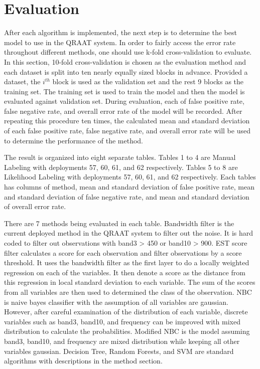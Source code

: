 \documentclass[twoside]{article}
\begin{document}

\section{Evaluation} 

After each algorithm is implemented, the next step is to determine the best model to use in the QRAAT system. In order to fairly access the error rate throughout different methods, one should use k-fold cross-validation to evaluate. In this section, 10-fold cross-validation is chosen as the evaluation method and each dataset is split into ten nearly equally sized blocks in advance. Provided a dataset, the $i^{th}$ block is used as the validation set and the rest 9 blocks as the training set. The training set is used to train the model and then the model is evaluated against validation set. During evaluation, each of false positive rate, false negative rate, and overall error rate of the model will be recorded. After repeating this procedure ten times, the calculated mean and standard deviation of each false positive rate, false negative rate, and overall error rate will be used to determine the performance of the method. 

The result is organized into eight separate tables. Tables 1 to 4 are Manual Labeling with deployments 57, 60, 61, and 62 respectively. Tables 5 to 8 are Likelihood Labeling with deployments 57, 60, 61, and 62 respectively. Each tables has columns of method, mean and standard deviation of false positive rate, mean and standard deviation of false negative rate, and mean and standard deviation of overall error rate. 

There are 7 methods being evaluated in each table. Bandwidth filter is the current deployed method in the QRAAT system to filter out the noise. It is hard coded to filter out observations with band3 > 450 or band10 > 900. EST score filter calculates a score for each observation and filter observations by a score threshold. It uses the bandwidth filter as the first layer to do a locally weighted regression on each of the variables. It then denote a score as the distance from this regression in local standard deviation to each variable. The sum of the scores from all variables are then used to determined the class of the observation. NBC is naive bayes classifier with the assumption of all variables are gaussian. However, after careful examination of the distribution of each variable, discrete variables such as band3, band10, and frequency can be improved with mixed distribution to calculate the probabilities. Modified NBC is the model assuming band3, band10, and frequency are mixed distribution while keeping all other variables gaussian. Decision Tree, Random Forests, and SVM are standard algorithms with descriptions in the method section.
\end{document}
